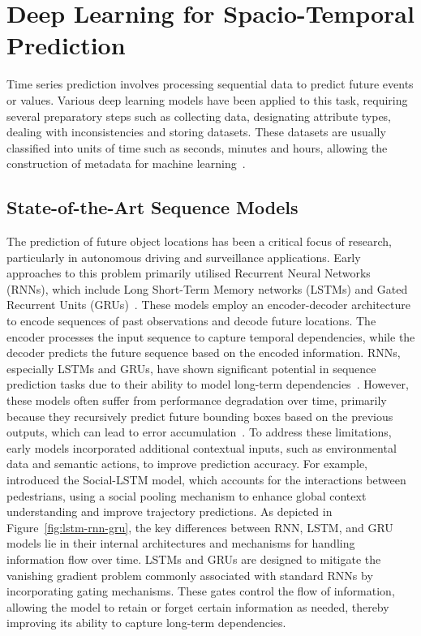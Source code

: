 \documentclass[12pt,oneside]{book} %
\begin{document}
\newpage
\section{Deep Learning for Spacio-Temporal Prediction}
Time series prediction involves processing sequential data to predict future
events or values. Various deep learning models have been applied to this task,
requiring several preparatory steps such as collecting data, designating
attribute types, dealing with inconsistencies and storing datasets. These
datasets are usually classified into units of time such as seconds, minutes and
hours, allowing the construction of metadata for machine
learning~\cite{FFPSpaceSystemVehicles}.

\subsection*{State-of-the-Art Sequence Models}

The prediction of future object locations has been a critical focus of
research, particularly in autonomous driving and surveillance applications.
Early approaches to this problem primarily utilised Recurrent Neural Networks
(RNNs), which include Long Short-Term Memory networks (LSTMs) and Gated
Recurrent Units (GRUs)~\cite{Alemany2019, Bemporad2023,
    PredictionHeadMovement360Degrees}. These models employ an encoder-decoder
architecture to encode sequences of past observations and decode future
locations. The encoder processes the input sequence to capture temporal
dependencies, while the decoder predicts the future sequence based on the
encoded information. RNNs, especially LSTMs and GRUs, have shown significant
potential in sequence prediction tasks due to their ability to model long-term
dependencies~\cite{CubicLSTMsVideoPrediction, ConvLSTM,
    DBLP:journals/corr/SrivastavaMS15}. However, these models often suffer from
performance degradation over time, primarily because they recursively predict
future bounding boxes based on the previous outputs, which can lead to error
accumulation~\cite{FusionGRU}. To address these limitations, early models
incorporated additional contextual inputs, such as environmental data and
semantic actions, to improve prediction accuracy. For example,
\citet{Alahi2016} introduced the Social-LSTM model, which accounts for the
interactions between pedestrians, using a social pooling mechanism to enhance
global context understanding and improve trajectory predictions. As depicted in
Figure~\ref{fig:lstm-rnn-gru}, the key differences between RNN, LSTM, and GRU
models lie in their internal architectures and mechanisms for handling
information flow over time. LSTMs and GRUs are designed to mitigate the
vanishing gradient problem commonly associated with standard RNNs by
incorporating gating mechanisms. These gates control the flow of information,
allowing the model to retain or forget certain information as needed, thereby
improving its ability to capture long-term dependencies.
\end{document}
